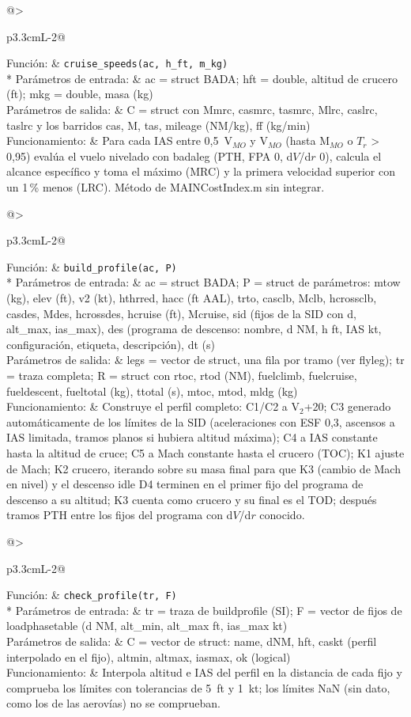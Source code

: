 \documentclass[11pt,a4paper]{article}
\makeatletter
\newcommand{\funcion}[4]{\par\Needspace{8\baselineskip}\begingroup\setlength{\LTleft}{0pt}\setlength{\LTright}{0pt}%
\setlength{\LTpre}{2mm}\setlength{\LTpost}{3mm}%
\begin{longtable}{@{}>{\bfseries\raggedright\arraybackslash}p{3.3cm}L{\dimexpr\linewidth-3.3cm-2\tabcolsep\relax}@{}}\toprule
Función: & \texttt{#1}\\* \midrule
Parámetros de entrada: & #2\\ \midrule
Parámetros de salida: & #3\\ \midrule
Funcionamiento: & #4\\ \bottomrule
\end{longtable}\addtocounter{table}{-1}\endgroup}
\DeclareRobustCommand{\m}[1]{{\ttfamily\def\_{\textunderscore\penalty100\relax}#1}}
\makeatother
\begin{document}
\funcion{cruise\_speeds(ac, h\_ft, m\_kg)}
{\m{ac} = struct BADA; \m{h\_ft} = double, altitud de crucero (ft); \m{m\_kg} = double, masa (kg)}
{\m{C} = struct con \m{M\_mrc}, \m{cas\_mrc}, \m{tas\_mrc}, \m{M\_lrc}, \m{cas\_lrc}, \m{tas\_lrc} y los barridos \m{cas}, \m{M}, \m{tas}, \m{mileage} (NM/kg), \m{ff} (kg/min)}
{Para cada IAS entre 0,5~V$_{MO}$ y V$_{MO}$ (hasta M$_{MO}$ o $T_r$ > 0,95) evalúa el vuelo nivelado con \m{bada\_leg} (PTH, FPA 0, d$V$/d$r$ 0), calcula el alcance específico y toma el máximo (MRC) y la primera velocidad superior con un 1\,\% menos (LRC). Método de \m{MAIN\_Cost\_Index.m} sin integrar.}

\funcion{build\_profile(ac, P)}
{\m{ac} = struct BADA; \m{P} = struct de parámetros: \m{m\_tow} (kg), \m{elev} (ft), \m{v2} (kt), \m{h\_thrred}, \m{h\_acc} (ft AAL), \m{tr\_to}, \m{cas\_clb}, \m{M\_clb}, \m{hcross\_clb}, \m{cas\_des}, \m{M\_des}, \m{hcross\_des}, \m{h\_cruise} (ft), \m{M\_cruise}, \m{sid} (fijos de la SID con d, alt\_max, ias\_max), \m{des} (programa de descenso: nombre, d NM, h ft, IAS kt, configuración, etiqueta, descripción), \m{dt} (s)}
{\m{legs} = vector de struct, una fila por tramo (ver \m{fly\_leg}); \m{tr} = traza completa; \m{R} = struct con \m{r\_toc}, \m{r\_tod} (NM), \m{fuel\_climb}, \m{fuel\_cruise}, \m{fuel\_descent}, \m{fuel\_total} (kg), \m{t\_total} (s), \m{m\_toc}, \m{m\_tod}, \m{m\_ldg} (kg)}
{Construye el perfil completo: C1/C2 a V$_2$+20; C3 generado automáticamente de los límites de la SID (aceleraciones con ESF 0,3, ascensos a IAS limitada, tramos planos si hubiera altitud máxima); C4 a IAS constante hasta la altitud de cruce; C5 a Mach constante hasta el crucero (TOC); K1 ajuste de Mach; K2 crucero, iterando sobre su masa final para que K3 (cambio de Mach en nivel) y el descenso idle D4 terminen en el primer fijo del programa de descenso a su altitud; K3 cuenta como crucero y su final es el TOD; después tramos PTH entre los fijos del programa con d$V$/d$r$ conocido.}

\funcion{check\_profile(tr, F)}
{\m{tr} = traza de \m{build\_profile} (SI); \m{F} = vector de fijos de \m{load\_phase\_table} (d NM, alt\_min, alt\_max ft, ias\_max kt)}
{\m{C} = vector de struct: name, \m{d\_NM}, \m{h\_ft}, \m{cas\_kt} (perfil interpolado en el fijo), \m{alt\_min}, \m{alt\_max}, \m{ias\_max}, \m{ok} (logical)}
{Interpola altitud e IAS del perfil en la distancia de cada fijo y comprueba los límites con tolerancias de 5~ft y 1~kt; los límites NaN (sin dato, como los de las aerovías) no se comprueban.}
\end{document}
